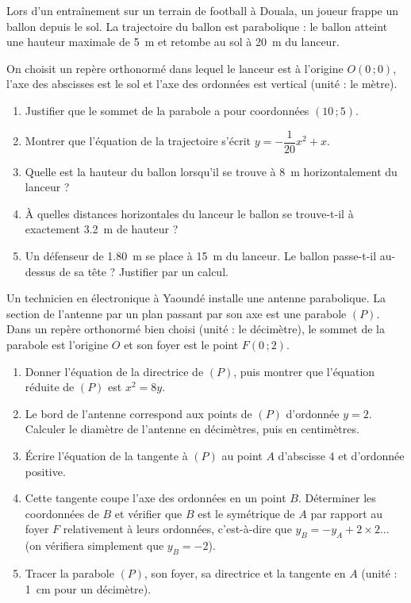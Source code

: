 \documentclass[11pt]{article}
\begin{document}
\begin{exercice}
Lors d'un entraînement sur un terrain de football à Douala, un joueur frappe un ballon depuis le sol. La trajectoire du ballon est parabolique : le ballon atteint une hauteur maximale de \SI{5}{m} et retombe au sol à \SI{20}{m} du lanceur.

On choisit un repère orthonormé dans lequel le lanceur est à l'origine $O(0\,;0)$, l'axe des abscisses est le sol et l'axe des ordonnées est vertical (unité : le mètre).
\begin{enumerate}
\item Justifier que le sommet de la parabole a pour coordonnées $(10\,;5)$.
\item Montrer que l'équation de la trajectoire s'écrit $y=-\dfrac{1}{20}x^{2}+x$.
\item Quelle est la hauteur du ballon lorsqu'il se trouve à \SI{8}{m} horizontalement du lanceur ?
\item À quelles distances horizontales du lanceur le ballon se trouve-t-il à exactement \SI{3,2}{m} de hauteur ?
\item Un défenseur de \SI{1,80}{m} se place à \SI{15}{m} du lanceur. Le ballon passe-t-il au-dessus de sa tête ? Justifier par un calcul.
\end{enumerate}
\end{exercice}

\begin{exercice}
Un technicien en électronique à Yaoundé installe une antenne parabolique. La section de l'antenne par un plan passant par son axe est une parabole $(P)$. Dans un repère orthonormé bien choisi (unité : le décimètre), le sommet de la parabole est l'origine $O$ et son foyer est le point $F(0\,;2)$.
\begin{enumerate}
\item Donner l'équation de la directrice de $(P)$, puis montrer que l'équation réduite de $(P)$ est $x^{2}=8y$.
\item Le bord de l'antenne correspond aux points de $(P)$ d'ordonnée $y=2$. Calculer le diamètre de l'antenne en décimètres, puis en centimètres.
\item Écrire l'équation de la tangente à $(P)$ au point $A$ d'abscisse $4$ et d'ordonnée positive.
\item Cette tangente coupe l'axe des ordonnées en un point $B$. Déterminer les coordonnées de $B$ et vérifier que $B$ est le symétrique de $A$ par rapport au foyer $F$ relativement à leurs ordonnées, c'est-à-dire que $y_{B}=-y_{A}+2\times 2$... (on vérifiera simplement que $y_{B}=-2$).
\item Tracer la parabole $(P)$, son foyer, sa directrice et la tangente en $A$ (unité : \SI{1}{cm} pour un décimètre).
\end{enumerate}
\end{exercice}
\end{document}
